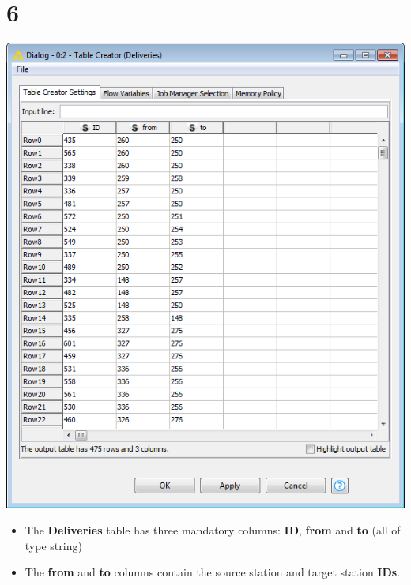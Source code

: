 \documentclass{beamer}
\begin{document}
\section{6}
\begin{frame}
	\begin{center}
  		\includegraphics[height=0.6\textheight]{6.png}
	\end{center}
	\begin{itemize}
		\item The \textbf{Deliveries} table has three mandatory columns: \textbf{ID}, \textbf{from} and \textbf{to} (all of type string)
		\item The \textbf{from} and \textbf{to} columns contain the source station and target station \textbf{IDs}.
	\end{itemize}
\end{frame}
\end{document}
